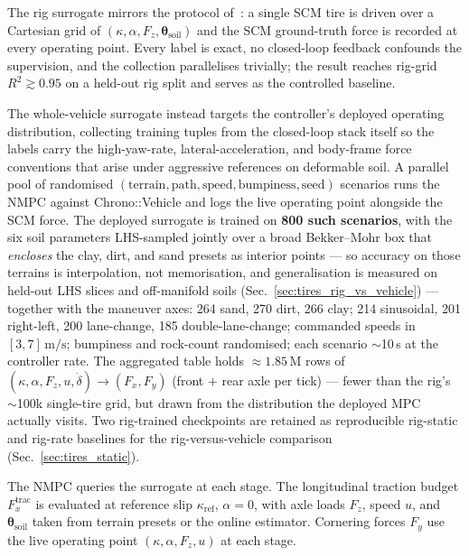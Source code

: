 \documentclass[conference,letterpaper,10pt]{IEEEtran}
\begin{document}
The rig surrogate mirrors the protocol of~\cite{Dallas21}: a single SCM
tire is driven over a Cartesian grid of $(\kappa, \alpha, F_z,
\boldsymbol{\theta}_{\mathrm{soil}})$ and the SCM ground-truth force is
recorded at every operating point. Every label is exact, no closed-loop
feedback confounds the supervision, and the collection parallelises
trivially; the result reaches rig-grid $R^2 \gtrsim 0.95$ on a held-out
rig split and serves as the controlled baseline.

The whole-vehicle surrogate instead targets the controller's deployed
operating distribution, collecting training tuples from the closed-loop
stack itself so the labels carry the high-yaw-rate,
lateral-acceleration, and body-frame force conventions that arise under
aggressive references on deformable soil. A parallel pool of randomised
$(\text{terrain}, \text{path}, \text{speed}, \text{bumpiness},
\text{seed})$ scenarios runs the NMPC against Chrono::Vehicle and logs
the live operating point alongside the SCM force. The deployed surrogate
is trained on \textbf{800 such scenarios}, with the six soil parameters
LHS-sampled jointly over a broad Bekker--Mohr box that \emph{encloses}
the clay, dirt, and sand presets as interior points --- so accuracy on
those terrains is interpolation, not memorisation, and generalisation is
measured on held-out LHS slices and off-manifold soils
(Sec.~\ref{sec:tires_rig_vs_vehicle}) --- together with the maneuver
axes: 264 sand, 270 dirt, 266 clay; 214 sinusoidal, 201 right-left, 200
lane-change, 185 double-lane-change; commanded speeds in
$[3,7]\,\mathrm{m/s}$; bumpiness and rock-count randomised; each scenario
$\sim$10\,s at the controller rate. The aggregated table holds
$\approx 1.85\,\mathrm{M}$ rows of
$(\kappa,\alpha,F_z,u,\dot\delta)\!\to\!(F_x,F_y)$ (front $+$ rear axle
per tick) --- fewer than the rig's $\sim$100k single-tire grid, but drawn
from the distribution the deployed MPC actually visits. Two rig-trained
checkpoints are retained as reproducible rig-static and rig-rate
baselines for the rig-versus-vehicle comparison
(Sec.~\ref{sec:tires_static}).

The NMPC queries the surrogate at each stage. The longitudinal
traction budget $F_x^{\mathrm{trac}}$ is evaluated at reference slip
$\kappa_{\mathrm{ref}}$, $\alpha = 0$, with axle loads $F_z$, speed
$u$, and $\boldsymbol{\theta}_{\mathrm{soil}}$ taken from terrain
presets or the online estimator. Cornering forces $F_y$ use the live
operating point $(\kappa, \alpha, F_z, u)$ at each stage.
\end{document}
